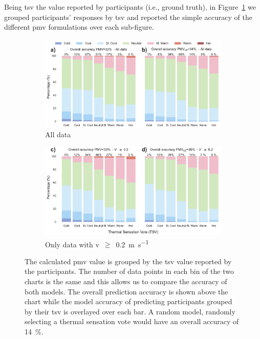 Being \ac{tsv} the value reported by participants (i.e., ground truth), in Figure~\ref{fig:bar_stacked_model_accuracy} we grouped participants' responses by \ac{tsv} and reported the simple accuracy of the different \ac{pmv} formulations over each sub-figure.
\begin{figure}[htb!]
    \centering
    \begin{subfigure}[b]{\textwidth}
        \centering
        \includegraphics[width=\textwidth]{figures/bar_stacked_model_accuracy_0}
        \caption{All data}
     \end{subfigure}
    \begin{subfigure}[b]{\textwidth}
        \centering
        \includegraphics[width=\textwidth]{figures/bar_stacked_model_accuracy_0.2}
        \caption{Only data with \ac{v}~$\geq$~\qty{0.2}{\m\per\s}}
     \end{subfigure}
    \caption{The calculated \ac{pmv} value is grouped by the \ac{tsv} value reported by the participants.
    The number of data points in each bin of the two charts is the same and this allows us to compare the accuracy of both models.
    The overall prediction accuracy is shown above the chart while the model accuracy of predicting participants grouped by their \ac{tsv} is overlayed over each bar.
    A random model, randomly selecting a thermal sensation vote would have an overall accuracy of \qty{14}{\percent}.}
    \label{fig:bar_stacked_model_accuracy}
\end{figure}
